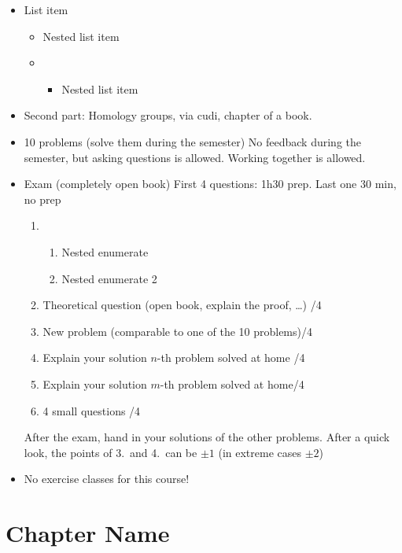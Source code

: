 

\begin{itemize}
    \item List item
        \begin{itemize}
            \item Nested list item
            \item \begin{itemize}
                \item Nested list item
            \end{itemize}
        \end{itemize}
    \item Second part: Homology groups, via cudi, chapter of a book.
    \item 10 problems (solve them during the semester) No feedback during the semester, but asking questions is allowed. Working together is allowed.
    \item Exam (completely open book) First 4 questions: 1h30 prep. Last one 30 min, no prep
        \begin{enumerate}
            \item \begin{enumerate}
                \item Nested enumerate
                \item Nested enumerate 2
            \end{enumerate}
            \item Theoretical question (open book, explain the proof, \ldots) \hfill /4
            \item New problem (comparable to one of the 10 problems)\hfill /4
            \item Explain your solution $n$-th problem solved at home \hfill /4
            \item Explain your solution $m$-th problem solved at home\hfill /4
            \item 4 small questions \hfill /4
        \end{enumerate}
        After the exam, hand in your solutions of the other problems. After a quick look, the points of 3.\ and 4.\ can be $\pm 1$ (in extreme cases $\pm 2$)
    \item No exercise classes for this course!
\end{itemize}

\setcounter{chapter}{-1}
\chapter{Chapter Name}


